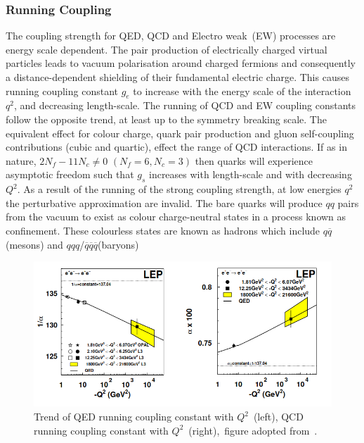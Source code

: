 \subsubsection{Running Coupling}
The coupling strength for QED, QCD and Electro weak~(EW) processes are energy scale dependent. The pair production of electrically charged virtual particles leads to vacuum polarisation around charged fermions and consequently a distance-dependent shielding of their fundamental electric charge. This causes running coupling constant $g_{e}$ to increase with the energy scale of the interaction $q^{2}$, and decreasing length-scale. The running of QCD and EW coupling constants follow the opposite trend, at least up to the symmetry breaking scale. The equivalent effect for colour charge, quark pair production and gluon self-coupling contributions (cubic and quartic), effect the range of QCD interactions. If as in nature, $2N_{f}-11N_{c}\neq 0$ $(N_{f} = 6, N_{c} = 3)$ then quarks will experience asymptotic freedom such that $g_{s}$ increases with length-scale and with decreasing $Q^{2}$. As a result of the running of the strong coupling strength, at low energies $q^{2}$ the perturbative approximation are invalid. The bare quarks will produce $qq$ pairs from the vacuum to exist as colour charge-neutral states in a process known as confinement. These colourless states are known as hadrons which include $q\overline{q}$ (mesons) and $qqq$/$ \overline{q}\overline{q}\overline{q}$(baryons)
\begin{figure}
\centering
\includegraphics[scale=0.5]{chapter1/alphas1.png}
\caption{Trend of QED running coupling constant with $Q^{2}$~(left), QCD running coupling constant with $Q^{2}$~(right),~figure adopted from~\cite{ACHARD200526}.}
\end{figure}
